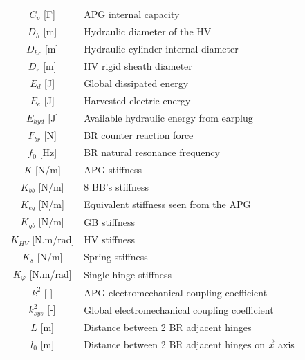 \documentclass[3p,twocolumn,preprint]{elsarticle}
\begin{document}
\begin{table}
\begin{minipage}{.5\textwidth}
\begin{tabular}{ c  m{6cm} }
		$C_p$ [F]                & APG internal capacity                                   \\
		$D_h$ [m]                & Hydraulic diameter of the HV                            \\
		$D_{hc}$ [m]             & Hydraulic cylinder internal diameter                    \\
		$D_r$ [m]                & HV rigid sheath diameter                                \\
		$E_d$ [J]                & Global dissipated energy                                \\
		$E_e$ [J]                & Harvested electric energy                               \\
		$E_{hyd}$ [J]            & Available hydraulic energy from earplug                 \\
		$F_{br}$ [N]             & BR counter reaction force                               \\
		$f_0$ [Hz]				 &	BR natural resonance frequency						   \\
		$K$ [N/m]                & APG stiffness                                           \\
		$K_{bb}$ [N/m]           & 8 BB's stiffness                                        \\
		$K_{eq}$ [N/m]           & Equivalent stiffness seen from the APG                  \\
		$K_{gb}$ [N/m]           & GB stiffness                                            \\
		$K_{HV}$ [N.m/rad]        & HV stiffness                                            \\
		$K_s$ [N/m]              & Spring stiffness                                        \\
		$K_{\varphi}$ [N.m/rad]   & Single hinge stiffness                                  \\
		$k^2$ [-]                & APG electromechanical coupling coefficient              \\
		$k_{sys}^2$ [-]          & Global electromechanical coupling coefficient           \\
		$L$ [m]                  & Distance between 2 BR adjacent hinges                   \\
		$l_0$ [m]                & Distance between 2 BR adjacent hinges on $\vec{x}$ axis \\
	\end{tabular}

\end{minipage}
\end{table}
\end{document}
